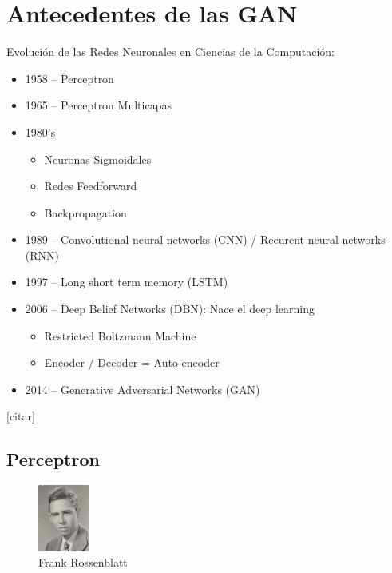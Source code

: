 \documentclass[a4paper]{article}
\begin{document}
\section{Antecedentes de las GAN}
Evolución de las Redes Neuronales en Ciencias de la Computación:
\begin{itemize}

    \item{1958 – Perceptron}
    \item{1965 – Perceptron Multicapas}
    \item{1980’s
    	\begin{itemize}
    	\item{Neuronas Sigmoidales}
        \item{Redes Feedforward}
        \item{Backpropagation}
        \end{itemize}
        }
    \item{1989 – Convolutional neural networks (CNN) / Recurent neural networks (RNN)}
    \item{1997 – Long short term memory (LSTM)}
    \item{2006 – Deep Belief Networks (DBN): Nace el deep learning}
    \begin{itemize}
    
        \item{Restricted Boltzmann Machine}
        \item{Encoder / Decoder = Auto-encoder}
        
    \end{itemize}
    \item{2014 – Generative Adversarial Networks (GAN)}

\end{itemize}[citar]


\subsection{Perceptron}
\begin{figure} %
    \centering
    \includegraphics[width=0.15\textwidth]{./images/220px-Rosenblatt_21.jpg}
    \caption{Frank Rossenblatt}
\end{figure}
\end{document}
